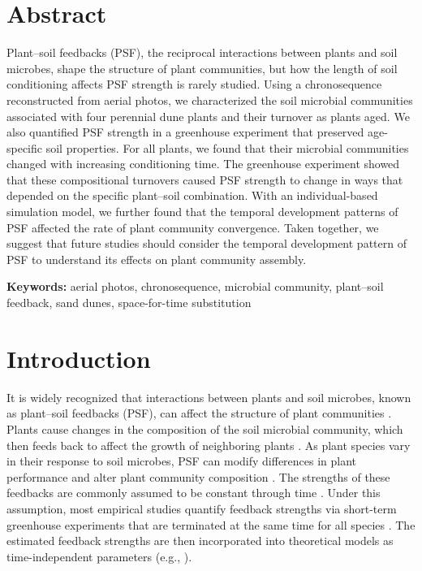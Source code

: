 \section{Abstract}
Plant--soil feedbacks (PSF), the reciprocal interactions between plants and soil microbes, shape the structure of plant communities, but how the length of soil conditioning affects PSF strength is rarely studied. 
Using a chronosequence reconstructed from aerial photos, we characterized the soil microbial communities associated with four perennial dune plants and their turnover as plants aged. 
We also quantified PSF strength in a greenhouse experiment that preserved age-specific soil properties.
For all plants, we found that their microbial communities changed with increasing conditioning time.
The greenhouse experiment showed that these compositional turnovers caused PSF strength to change in ways that depended on the specific plant--soil combination. 
With an individual-based simulation model, we further found that the temporal development patterns of PSF affected the rate of plant community convergence. 
Taken together, we suggest that future studies should consider the temporal development pattern of PSF to understand its effects on plant community assembly.
\medskip


\noindent \textbf{Keywords:} aerial photos, chronosequence, microbial community, plant--soil feedback, sand dunes, space-for-time substitution



\section{Introduction}
It is widely recognized that interactions between plants and soil microbes, known as plant--soil feedbacks (PSF), can affect the structure of plant communities \citep{Bever2010, vanderPutten2013, KeMiki2015}. 
Plants cause changes in the composition of the soil microbial community, which then feeds back to affect the growth of neighboring plants \citep{Bever1997, Bever2003}. As plant species vary in their response to soil microbes, PSF can modify differences in plant performance and alter plant community composition \citep{Klironomos2002, Mangan2010, Eppinga2018}.
The strengths of these feedbacks are commonly assumed to be constant through time \citep{Kardol2013}. Under this assumption, most empirical studies quantify feedback strengths via short-term greenhouse experiments that are terminated at the same time for all species \citep{KulmatiskiKardol2008, Kardol2013}. The estimated feedback strengths are then incorporated into theoretical models as time-independent parameters (e.g., \citealp{Fukami2013, Bauer2015, Teste2017}). 
\par


